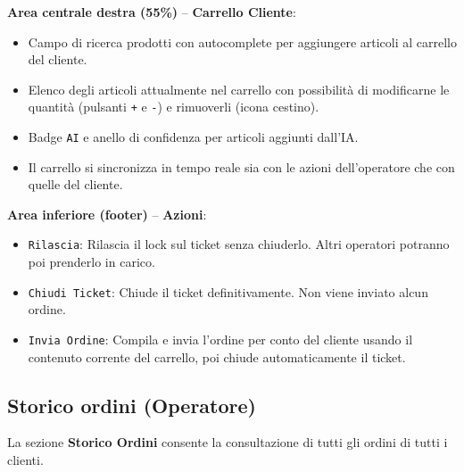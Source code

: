 \documentclass[a4paper, 11pt, oneside]{scrartcl}
\begin{document}
\textbf{Area centrale destra (55\%)} -- \textbf{Carrello Cliente}:
\begin{itemize}
    \item Campo di ricerca prodotti con autocomplete per aggiungere articoli al carrello del cliente.
    \item Elenco degli articoli attualmente nel carrello con possibilit\`a di modificarne le quantit\`a (pulsanti \texttt{+} e \texttt{-}) e rimuoverli (icona cestino).
    \item Badge \texttt{AI} e anello di confidenza per articoli aggiunti dall'IA.
    \item Il carrello si sincronizza in tempo reale sia con le azioni dell'operatore che con quelle del cliente.
\end{itemize}

\textbf{Area inferiore (footer)} -- \textbf{Azioni}:
\begin{itemize}
    \item \texttt{Rilascia}: Rilascia il lock sul ticket senza chiuderlo. Altri operatori potranno poi prenderlo in carico.
    \item \texttt{Chiudi Ticket}: Chiude il ticket definitivamente. Non viene inviato alcun ordine.
    \item \texttt{Invia Ordine}: Compila e invia l'ordine per conto del cliente usando il contenuto corrente del carrello, poi chiude automaticamente il ticket.
\end{itemize}

\subsection{Storico ordini (Operatore)}

La sezione \textbf{Storico Ordini} consente la consultazione di tutti gli ordini di tutti i clienti.
\end{document}
